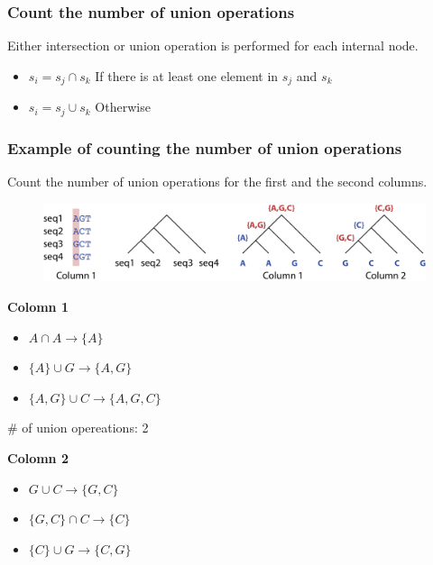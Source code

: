 %
%
\subsubsection*{Count the number of union operations}
Either intersection or union operation is performed for each internal node.

\begin{itemize}
\item $s_i=s_j \cap s_k$ \quad If there is at least one element in $s_j$ and $s_k$
\item $s_i=s_j \cup s_k$ \quad Otherwise
\end{itemize}

%
%
\subsubsection*{Example of counting the number of union operations}
Count the number of union operations for the first and the second columns.

\begin{figure}[H]
  \centering
      \includegraphics[width=0.8 \textwidth]{fig09/union_operations.png}
\end{figure}

\noindent
\textbf{Colomn 1}
\begin{itemize}
\item $A \cap A \rightarrow \{A\}$ 
\item $\{A\} \cup G \rightarrow \{A, G\}$ 
\item $\{A, G\} \cup C \rightarrow \{A, G, C\}$
\end{itemize}

\# of union opereations: 2

\bigskip 

\noindent
\textbf{Colomn 2}
\begin{itemize}
\item $G \cup C \rightarrow \{G, C\}$ 
\item $\{G, C\} \cap C \rightarrow \{C\}$ 
\item $\{C\} \cup G \rightarrow \{C, G\}$
\end{itemize}

